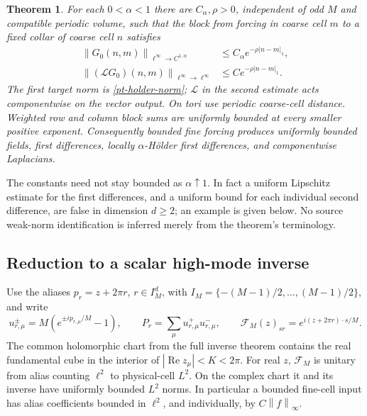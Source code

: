 \documentclass[11pt]{article}
\newtheorem{theorem}{Theorem}[section]
\theoremstyle{remark}
\newcommand{\norm}[1]{\left\|#1\right\|}
\begin{document}
\begin{theorem}\label{pt-theorem}
For each $0<\alpha<1$ there are $C_\alpha,\rho>0$, independent of
odd $M$ and compatible periodic volume, such that the block from
forcing in coarse cell $m$ to a fixed collar of coarse cell $n$ satisfies
\begin{align}
 \norm{G_0(n,m)}_{\ell^\infty\to C^{1,\alpha}}
       &\le C_\alpha e^{-\rho|n-m|_1},
       \label{pt-pointwise-bound}\\
 \norm{(\mathcal L G_0)(n,m)}_{\ell^\infty\to\ell^\infty}
       &\le C e^{-\rho|n-m|_1}.
       \label{pt-laplacian-bound}
\end{align}
The first target norm is \eqref{pt-holder-norm}; $\mathcal L$ in
the second estimate acts componentwise on the vector output.
On tori use periodic coarse-cell distance. Weighted row and column
block sums are uniformly bounded at every smaller positive exponent.
Consequently bounded fine forcing produces uniformly bounded fields,
first differences, locally $\alpha$-H\"older first differences, and
componentwise Laplacians.
\end{theorem}

The constants need not stay bounded as $\alpha\uparrow1$. In fact a
uniform Lipschitz estimate for the first differences, and a uniform
bound for each individual second difference, are false in dimension
$d\ge2$; an example is given below. No source weak-norm identification
is inferred merely from the theorem's terminology.

\subsection{Reduction to a scalar high-mode inverse}

Use the aliases $p_r=z+2\pi r$, $r\in I_M^d$, with
$I_M=\{-(M-1)/2,\ldots,(M-1)/2\}$, and write
\begin{equation}\label{pt-alias-data}
 u_{r,\mu}^{\pm}=M(e^{\pm ip_{r,\mu}/M}-1),\qquad
 P_r=\sum_\mu u_{r,\mu}^+u_{r,\mu}^-,\qquad
 \mathcal F_M(z)_{sr}=e^{i(z+2\pi r)\cdot s/M}.
\end{equation}
The common holomorphic chart from the full inverse theorem contains
the real fundamental cube in the interior of $|\operatorname{Re}z_\mu|<K<2\pi$.
For real $z$, $\mathcal F_M$ is unitary from alias counting $\ell^2$
to physical-cell $L^2$. On the complex chart it and its inverse have
uniformly bounded $L^2$ norms. In particular a bounded fine-cell input
has alias coefficients bounded in $\ell^2$, and individually, by
$C\norm{f}_\infty$.
\end{document}
